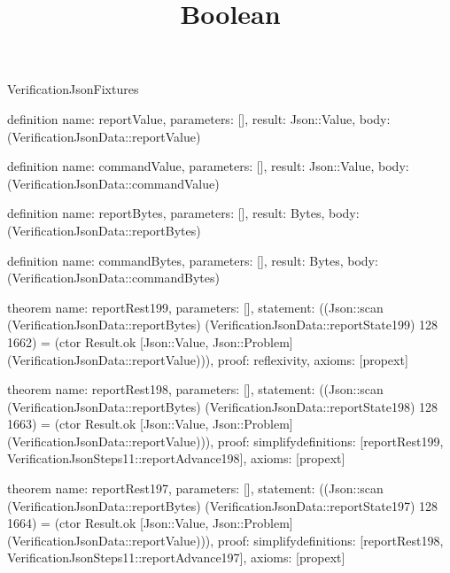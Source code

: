 \begin{lexlean}{VerificationJsonFixtures}
\title{Boolean}
\begin{semanticmodule}

definition{
  name: reportValue,
  parameters: [],
  result: Json::Value,
  body: (VerificationJsonData::reportValue)
}

definition{
  name: commandValue,
  parameters: [],
  result: Json::Value,
  body: (VerificationJsonData::commandValue)
}

definition{
  name: reportBytes,
  parameters: [],
  result: Bytes,
  body: (VerificationJsonData::reportBytes)
}

definition{
  name: commandBytes,
  parameters: [],
  result: Bytes,
  body: (VerificationJsonData::commandBytes)
}

theorem{
  name: reportRest199,
  parameters: [],
  statement: ((Json::scan (VerificationJsonData::reportBytes) (VerificationJsonData::reportState199) 128 1662) = (ctor Result.ok [Json::Value, Json::Problem] (VerificationJsonData::reportValue))),
  proof: reflexivity{},
  axioms: [propext]
}

theorem{
  name: reportRest198,
  parameters: [],
  statement: ((Json::scan (VerificationJsonData::reportBytes) (VerificationJsonData::reportState198) 128 1663) = (ctor Result.ok [Json::Value, Json::Problem] (VerificationJsonData::reportValue))),
  proof: simplify{definitions: [reportRest199, VerificationJsonSteps11::reportAdvance198]},
  axioms: [propext]
}

theorem{
  name: reportRest197,
  parameters: [],
  statement: ((Json::scan (VerificationJsonData::reportBytes) (VerificationJsonData::reportState197) 128 1664) = (ctor Result.ok [Json::Value, Json::Problem] (VerificationJsonData::reportValue))),
  proof: simplify{definitions: [reportRest198, VerificationJsonSteps11::reportAdvance197]},
  axioms: [propext]
}


\end{semanticmodule}
\end{lexlean}
